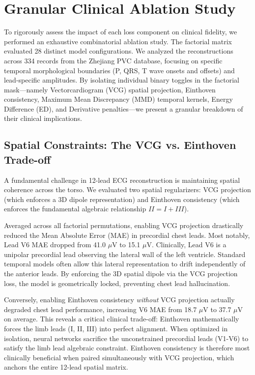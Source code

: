\section{Granular Clinical Ablation Study}
\label{sec:granular_ablation}

To rigorously assess the impact of each loss component on clinical fidelity, we performed an exhaustive combinatorial ablation study. The factorial matrix evaluated 28 distinct model configurations. We analyzed the reconstructions across 334 records from the Zhejiang PVC database, focusing on specific temporal morphological boundaries (P, QRS, T wave onsets and offsets) and lead-specific amplitudes. By isolating individual binary toggles in the factorial mask---namely Vectorcardiogram (VCG) spatial projection, Einthoven consistency, Maximum Mean Discrepancy (MMD) temporal kernels, Energy Difference (ED), and Derivative penalties---we present a granular breakdown of their clinical implications.

\subsection{Spatial Constraints: The VCG vs. Einthoven Trade-off}
A fundamental challenge in 12-lead ECG reconstruction is maintaining spatial coherence across the torso. We evaluated two spatial regularizers: VCG projection (which enforces a 3D dipole representation) and Einthoven consistency (which enforces the fundamental algebraic relationship $II = I + III$).

Averaged across all factorial permutations, enabling VCG projection drastically reduced the Mean Absolute Error (MAE) in precordial chest leads. Most notably, Lead V6 MAE dropped from 41.0 $\mu$V to 15.1 $\mu$V. Clinically, Lead V6 is a unipolar precordial lead observing the lateral wall of the left ventricle. Standard temporal models often allow this lateral representation to drift independently of the anterior leads. By enforcing the 3D spatial dipole via the VCG projection loss, the model is geometrically locked, preventing chest lead hallucination.

Conversely, enabling Einthoven consistency \textit{without} VCG projection actually degraded chest lead performance, increasing V6 MAE from 18.7 $\mu$V to 37.7 $\mu$V on average. This reveals a critical clinical trade-off: Einthoven mathematically forces the limb leads (I, II, III) into perfect alignment. When optimized in isolation, neural networks sacrifice the unconstrained precordial leads (V1-V6) to satisfy the limb lead algebraic constraint. Einthoven consistency is therefore most clinically beneficial when paired simultaneously with VCG projection, which anchors the entire 12-lead spatial matrix.

